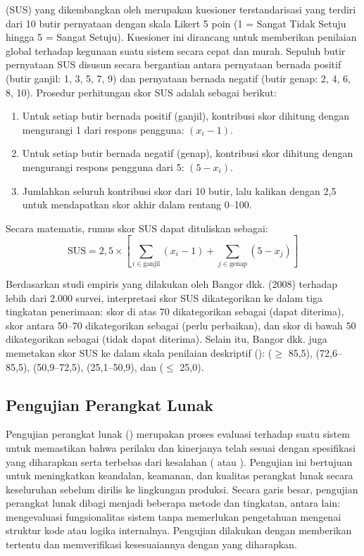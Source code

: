  (SUS) yang dikembangkan oleh \citet{brooke_sus_1986} merupakan kuesioner terstandarisasi yang terdiri dari 10 butir pernyataan dengan skala Likert 5 poin (1 = Sangat Tidak Setuju hingga 5 = Sangat Setuju). Kuesioner ini dirancang untuk memberikan penilaian global terhadap kegunaan suatu sistem secara cepat dan murah. Sepuluh butir pernyataan SUS disusun secara bergantian antara pernyataan bernada positif (butir ganjil: 1, 3, 5, 7, 9) dan pernyataan bernada negatif (butir genap: 2, 4, 6, 8, 10). Prosedur perhitungan skor SUS adalah sebagai berikut:
\begin{enumerate}
    \item Untuk setiap butir bernada positif (ganjil), kontribusi skor dihitung dengan mengurangi 1 dari respons pengguna: $(x_i - 1)$.
    \item Untuk setiap butir bernada negatif (genap), kontribusi skor dihitung dengan mengurangi respons pengguna dari 5: $(5 - x_i)$.
    \item Jumlahkan seluruh kontribusi skor dari 10 butir, lalu kalikan dengan 2,5 untuk mendapatkan skor akhir dalam rentang 0--100.
\end{enumerate}
Secara matematis, rumus skor SUS dapat dituliskan sebagai:
\begin{equation}
    \text{SUS} = 2{,}5 \times \left[ \sum_{i \in \text{ganjil}} (x_i - 1) + \sum_{j \in \text{genap}} (5 - x_j) \right]
\end{equation}

Berdasarkan studi empiris yang dilakukan oleh Bangor dkk. (2008) terhadap lebih dari 2.000 survei, interpretasi skor SUS dikategorikan ke dalam tiga tingkatan penerimaan: skor di atas 70 dikategorikan sebagai  (dapat diterima), skor antara 50--70 dikategorikan sebagai  (perlu perbaikan), dan skor di bawah 50 dikategorikan sebagai  (tidak dapat diterima). Selain itu, Bangor dkk. juga memetakan skor SUS ke dalam skala penilaian deskriptif ():  ($\geq$ 85,5),  (72,6--85,5),  (50,9--72,5),  (25,1--50,9), dan  ($\leq$ 25,0).

\subsection{Pengujian Perangkat Lunak}
Pengujian perangkat lunak () merupakan proses evaluasi terhadap suatu sistem untuk memastikan bahwa perilaku dan kinerjanya telah sesuai dengan spesifikasi yang diharapkan serta terbebas dari kesalahan ( atau ). Pengujian ini bertujuan untuk meningkatkan keandalan, keamanan, dan kualitas perangkat lunak secara keseluruhan sebelum dirilis ke lingkungan produksi. Secara garis besar, pengujian perangkat lunak dibagi menjadi beberapa metode dan tingkatan, antara lain:
 mengevaluasi fungsionalitas sistem tanpa memerlukan pengetahuan mengenai struktur kode atau logika internalnya. Pengujian dilakukan dengan memberikan  tertentu dan memverifikasi kesesuaiannya dengan  yang diharapkan.


